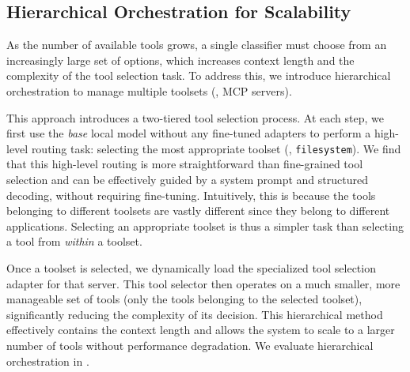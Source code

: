 \subsection{Hierarchical Orchestration for Scalability}
As the number of available tools grows, a single classifier must choose from an increasingly large set of options, which increases context length and the complexity of the tool selection task. To address this, we introduce hierarchical orchestration to manage multiple toolsets (\ie, MCP servers). 

This approach introduces a two-tiered tool selection process. At each step, we first use the \emph{base} local model without any fine-tuned adapters to perform a high-level routing task: selecting the most appropriate toolset (\eg, \texttt{filesystem}). We find that this high-level routing is more straightforward than fine-grained tool selection and can be effectively guided by a system prompt and structured decoding, without requiring fine-tuning. Intuitively, this is because the tools belonging to different toolsets are vastly different since they belong to different applications. Selecting an appropriate toolset is thus a simpler task than selecting a tool from \emph{within} a toolset. 

Once a toolset is selected, we dynamically load the specialized tool selection adapter for that server. This tool selector then operates on a much smaller, more manageable set of tools (only the tools belonging to the selected toolset), significantly reducing the complexity of its decision. This hierarchical method effectively contains the context length and allows the system to scale to a larger number of tools without performance degradation. We evaluate hierarchical orchestration in .


